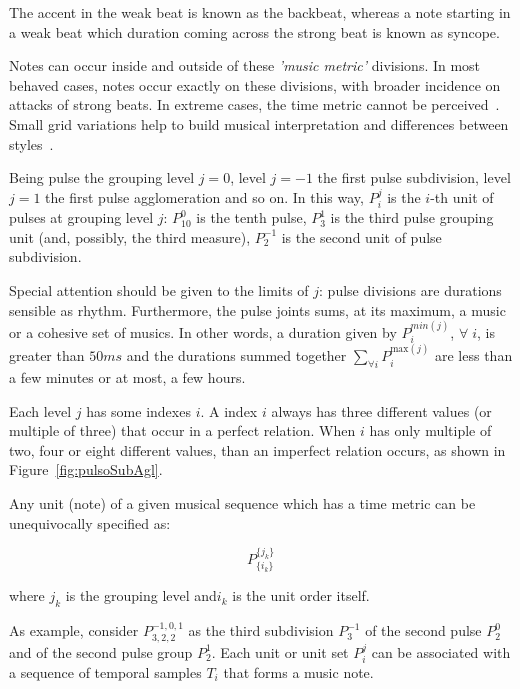 \documentclass[
 aip,
 jmp,
 amsmath,amssymb,
 reprint,
]{revtex4-1}
\begin{document}
The accent in the weak beat is known as the backbeat, whereas a note starting in a weak
beat which duration coming across the strong beat is known as syncope.

Notes can occur inside and outside of these \emph{'music metric'} divisions. In
most behaved cases, notes occur exactly on these divisions, with broader
incidence on attacks of strong beats.
In extreme cases, the time metric cannot be perceived~\cite{Roederer}. 
Small grid variations help to build musical interpretation and differences
between styles~\cite{Cook}.


Being pulse the grouping level $j=0$, level $j=-1$ the first pulse subdivision,
level $j=1$ the first pulse agglomeration and so on. In this way, $P_i^j$ is the
$i$-th unit of pulses at grouping level $j$: $P^0_{10}$ is the tenth pulse,
$P^{1}_3$ is the third pulse grouping unit (and, possibly, the third measure),
$P^{-1}_2$ is the second unit of pulse subdivision.

Special attention should be given to the limits of $j$: pulse divisions are
durations sensible as rhythm. Furthermore, the pulse joints sums, at its
maximum, a music or a cohesive set of musics. In other words, a duration given
by $P^{min(j)}_i$, $\forall \; i$, is greater than $50 ms$ and the durations
summed together $\sum_{\forall i}P^{\text{max}(j)}_i$ are less than a few
minutes or at most, a few hours.

Each level $j$ has some indexes $i$. A index $i$ always has three different
values (or multiple of three) that occur in a perfect relation. When $i$ has only
multiple of two, four or eight different values, than an imperfect relation occurs,
as shown in Figure~\ref{fig:pulsoSubAgl}.

Any unit (note) of a given musical sequence which has a time metric can be unequivocally
specified as:

\begin{equation}
P^{ \{ j_k \} }_{ \{ i_{k} \}}
\end{equation}

\noindent where $j_k$ is the grouping level and$i_k$ is the unit order itself.

As example, consider $P^{-1,0,1}_{3,2,2}$ as the third subdivision $P^{-1}_3$ of the
second pulse $P^0_2$ and of the second pulse group $P^1_2$. Each unit or unit set
$P_i^j$ can be associated with a sequence of temporal samples $T_i$ that forms a
music note.
\end{document}
